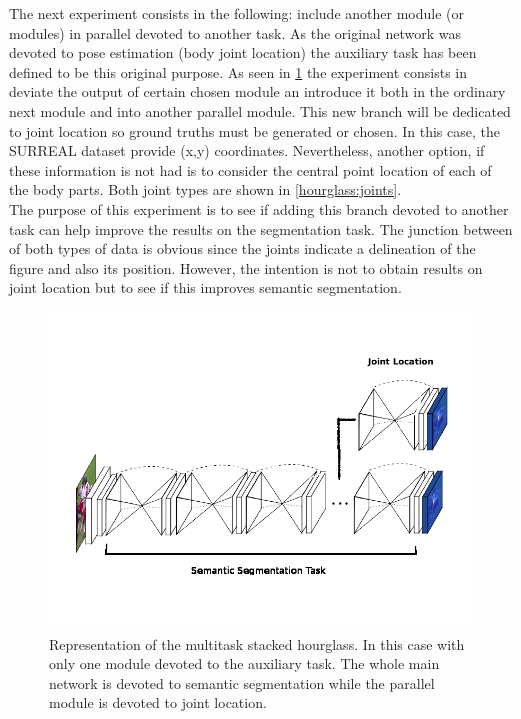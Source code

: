 The next experiment consists in the following: include another module (or modules) in parallel devoted to another task. As the original network was devoted to pose estimation (body joint location) the auxiliary task has been defined to be this original purpose. As seen in \ref{hourglass:multitask} the experiment consists in deviate the output of certain chosen module an introduce it both in the ordinary next module and into another parallel module. This new branch will be dedicated to joint location so ground truths must be generated or chosen. In this case, the SURREAL dataset provide (x,y) coordinates. Nevertheless, another option, if these information is not had is to consider the central point location of each of the body parts. Both joint types are shown in \ref{hourglass:joints}.\\

The purpose of this experiment is to see if adding this branch devoted to another task can help improve the results on the segmentation task. The junction between of both types of data is obvious since the joints indicate a delineation of the figure and also its position. However, the intention is not to obtain results on joint location but to see if this improves semantic segmentation.\\


\begin{figure}
\centering
\includegraphics[scale=0.4]{multitask.png}
\caption{Representation of the multitask stacked hourglass. In this case with only one module devoted to the auxiliary task. The whole main network is devoted to semantic segmentation while the parallel module is devoted to joint location.}
\label{hourglass:multitask}
\end{figure}




